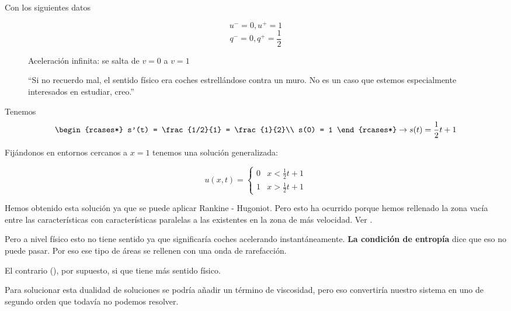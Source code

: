 		\newpage %
		\obs Con los siguientes datos

		$$u^{-} = 0, u^+ = 1$$
		$$q^{-} = 0, q^+ = \frac{1}{2}$$

		\begin{figure}[hbtp]
			\centering
			\begin{minipage}[t]{0.45\textwidth}
				\centering
				\caption{Aceleración infinita: se salta de $v=0$ a $v=1$}
				\label{fig:obs-aceleracion-infinita}
			\end{minipage}\quad
			\begin{minipage}[t]{0.45\textwidth}
				\centering
				\caption{``Si no recuerdo mal, el sentido físico era coches estrellándose contra un muro. No es un caso que estemos especialmente interesados en estudiar, creo.''}
				\label{fig:obs-muro}
			\end{minipage}
		\end{figure}

		Tenemos
		\[
		\begin{rcases*}
			s'(t) = \frac{1/2}{1} = \frac{1}{2}\\
			s(0) = 1
		\end{rcases*} \rightarrow s(t) = \frac{1}{2}t + 1
		\]

		Fijándonos en entornos cercanos a $x=1$ tenemos una solución generalizada:

		$$u(x,t) =
		\begin{cases}
			0 & x < \frac{1}{2} t + 1 \\
			1 & x > \frac{1}{2} t + 1
		\end{cases}$$


		Hemos obtenido esta solución ya que se puede aplicar Rankine - Hugoniot. Pero esto ha ocurrido porque hemos rellenado la zona vacía entre las características con características paralelas a las existentes en la zona de más velocidad. Ver .

		Pero a nivel físico esto no tiene sentido ya que significaría coches acelerando instantáneamente. {\bf La condición de entropía} dice que eso no puede pasar. Por eso ese tipo de áreas se rellenen con una onda de rarefacción.

		El contrario (), por supuesto, si que tiene más sentido físico.

		Para solucionar esta dualidad de soluciones se podría añadir un término de viscosidad, pero eso convertiría nuestro sistema en uno de segundo orden que todavía no podemos resolver.

